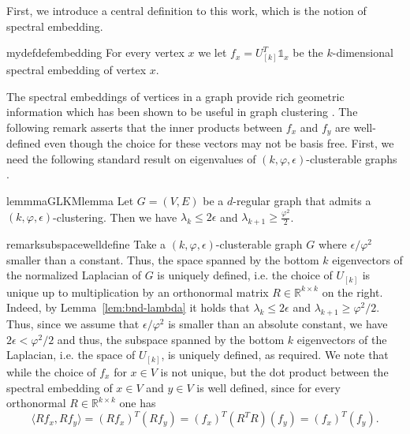\documentclass[letterpaper,11pt]{article}
\newcommand{\R}{\mathbb{R}}
\theoremstyle{plain}
\theoremstyle{definition}
\theoremstyle{remark}
\newcommand{\e}{\epsilon}
\begin{document}
First, we introduce a central definition to this work, which is the notion of spectral embedding. 

\begin{restatable}{mydef}{defembedding}\label{def:spec-emb}
For every vertex $x$ we let $f_x=U_{[k]}^T  \mathds{1}_x $ be the $k$-dimensional spectral embedding of vertex $x$.
\end{restatable}

The spectral embeddings of vertices in a graph provide rich geometric information which has been
shown to be useful in graph clustering \cite{lee2014multiway, CzumajPS15, chiplunkar2018testing, GluchKLMS21}.
The following remark asserts that the inner products between $f_x$ and
$f_y$ are well-defined even though the choice for these vectors may not be basis free. First, we need the following 
standard result on eigenvalues of $(k, \varphi, \e)$-clusterable graphs \cite{lee2014multiway, chiplunkar2018testing}.

\begin{restatable}{lemmma}{GLKMlemma}
\label{lem:bnd-lambda}
Let $G=(V,E)$ be a $d$-regular graph that admits a $(k,\varphi,\epsilon)$-clustering. Then we have $\lambda_k\leq 2\epsilon$ and $\lambda_{k+1}\geq \frac{\varphi^2}{2}$. 
\end{restatable}

\begin{restatable}{remark}{subspacewelldefine}\label{rm:dot-products-well-defined}
	Take a $(k,\varphi,\epsilon)$-clusterable graph $G$ where $\e/\varphi^2$ smaller than a constant. Thus, 
	the space spanned by the bottom $k$ eigenvectors of the normalized Laplacian 
	of $G$ is uniquely defined, i.e. the choice of $U_{[k]}$ is unique up to multiplication 
	by an orthonormal matrix $R\in \R^{k \times k}$ on the right.  Indeed, 
	by Lemma~\ref{lem:bnd-lambda} it holds that $\lambda_k \leq 2 \e$ and $\lambda_{k+1} \geq \varphi^2/2$. 
	Thus, since we assume that $\e/\varphi^2$ is smaller than an 
	absolute constant, we have $2 \e < \varphi^2/2$ and thus, the subspace spanned by the 
	bottom $k$ eigenvectors of the 
	Laplacian, i.e. the space of $U_{[k]}$, is uniquely defined, as required. We note 
	that while the choice of $f_x$ for $x \in V$ is not unique, but  the dot product 
	between the spectral embedding of $x\in V$ and $y\in V$ is well defined, since for every orthonormal 
	$R\in \R^{k\times k}$ one has  
	\[\langle Rf_x, Rf_y\rangle=(Rf_x)^T(Rf_y)=\left(f_x\right)^T (R^TR) \left(f_y\right)=\left(f_x\right)^T\left(f_y\right)\text{.}\]
\end{restatable}
\end{document}
